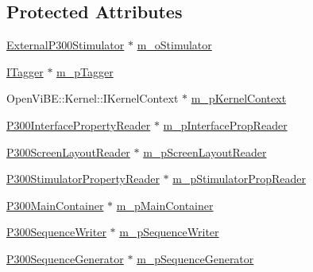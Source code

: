 \subsection*{Protected Attributes}
\begin{DoxyCompactItemize}
\item 
\hyperlink{classOpenViBEApplications_1_1ExternalP300Stimulator}{ExternalP300Stimulator} $\ast$ \hyperlink{classOpenViBEApplications_1_1ExternalP300Visualiser_a681ca45d6909f4702eea8b732e5c0267}{m\_\-oStimulator}
\item 
\hyperlink{classOpenViBEApplications_1_1ITagger}{ITagger} $\ast$ \hyperlink{classOpenViBEApplications_1_1ExternalP300Visualiser_a4358bd9d5623138cd6a5516e988536b2}{m\_\-pTagger}
\item 
OpenViBE::Kernel::IKernelContext $\ast$ \hyperlink{classOpenViBEApplications_1_1ExternalP300Visualiser_aaeac05e7590e589f7167aeec97b9712a}{m\_\-pKernelContext}
\item 
\hyperlink{classOpenViBEApplications_1_1P300InterfacePropertyReader}{P300InterfacePropertyReader} $\ast$ \hyperlink{classOpenViBEApplications_1_1ExternalP300Visualiser_a24c1d41f231682b4527171f3b5ba86d1}{m\_\-pInterfacePropReader}
\item 
\hyperlink{classOpenViBEApplications_1_1P300ScreenLayoutReader}{P300ScreenLayoutReader} $\ast$ \hyperlink{classOpenViBEApplications_1_1ExternalP300Visualiser_aad1840ac9784503247ad735b295f8027}{m\_\-pScreenLayoutReader}
\item 
\hyperlink{classOpenViBEApplications_1_1P300StimulatorPropertyReader}{P300StimulatorPropertyReader} $\ast$ \hyperlink{classOpenViBEApplications_1_1ExternalP300Visualiser_a1e6cc7a87f3033f5118a2de7c6b850c4}{m\_\-pStimulatorPropReader}
\item 
\hyperlink{classOpenViBEApplications_1_1P300MainContainer}{P300MainContainer} $\ast$ \hyperlink{classOpenViBEApplications_1_1ExternalP300Visualiser_a41e13bb1e9208989a27b9d99d620eb01}{m\_\-pMainContainer}
\item 
\hyperlink{classOpenViBEApplications_1_1P300SequenceWriter}{P300SequenceWriter} $\ast$ \hyperlink{classOpenViBEApplications_1_1ExternalP300Visualiser_a4f56254ed488ec70b79c61116c2b4739}{m\_\-pSequenceWriter}
\item 
\hyperlink{classOpenViBEApplications_1_1P300SequenceGenerator}{P300SequenceGenerator} $\ast$ \hyperlink{classOpenViBEApplications_1_1ExternalP300Visualiser_a3891dbe652e540d5739b689c9a82f1e1}{m\_\-pSequenceGenerator}
\end{DoxyCompactItemize}
